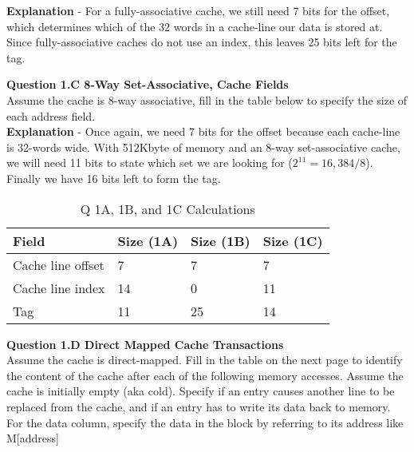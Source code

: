 \documentclass[a4paper,11pt]{article}
\begin{document}
\textbf{Explanation} - For a fully-associative cache, we still need 7 bits for the offset, which determines which of the 32 words in a cache-line our data is stored at. Since fully-associative caches do not use an index, this leaves 25 bits left for the tag. 


\item \textbf{Question 1.C 8-Way Set-Associative, Cache Fields} \\
Assume the cache is 8-way associative, fill in the table below to specify the size of each address field. \\

\textbf{Explanation} - Once again, we need 7 bits for the offset because each cache-line is 32-words wide. With 512Kbyte of memory and an 8-way set-associative cache, we will need 11 bits to state which set we are looking for ($2^{11} =16,384/8$). Finally we have 16 bits left to form the tag.

\begin{table}[H]
\caption{Q 1A, 1B, and 1C Calculations} \label{tab:q1calc} 
\begin{center}
\begin{tabular}{| l | l | l | l |} \hline 
   Field              &  Size (1A) & Size (1B) & Size (1C)     \\ \hline
   Cache line offset  &  7         &   7       &   7           \\ \hline
   Cache line index   &  14        &   0       &   11          \\ \hline
   Tag                &  11        &   25      &   14          \\ \hline
\end{tabular}
\end{center}
\end{table}



\item \textbf{Question 1.D Direct Mapped Cache Transactions } \\

Assume the cache is direct-mapped. Fill in the table on the next page to identify the content of the cache after each of the following memory accesses. Assume the cache is initially empty (aka cold). Specify if an entry causes another line to be replaced from the cache, and if an entry has to write its data back to memory. For the data column, specify the data in the block by referring to its address like M[address]
\end{document}
